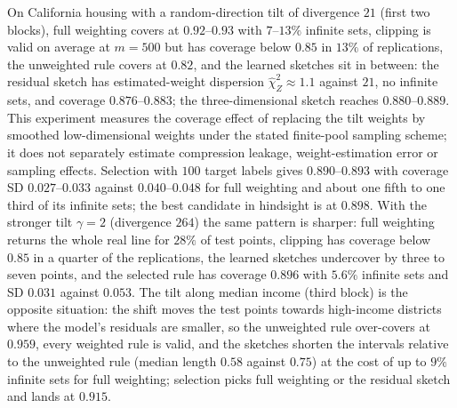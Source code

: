 \documentclass[11pt,a4paper]{article}
\theoremstyle{plain}
\theoremstyle{definition}
\theoremstyle{remark}
\begin{document}
On California housing with a random-direction tilt of divergence $21$ (first two blocks), full weighting covers at $0.92$--$0.93$ with $7$--$13\%$ infinite sets, clipping is valid on average at $m=500$ but has coverage below $0.85$ in $13\%$ of replications, the unweighted rule covers at $0.82$, and the learned sketches sit in between: the residual sketch has estimated-weight dispersion $\hat\chi^2_Z\approx1.1$ against $21$, no infinite sets, and coverage $0.876$--$0.883$; the three-dimensional sketch reaches $0.880$--$0.889$. This experiment measures the coverage effect of replacing the tilt weights by smoothed low-dimensional weights under the stated finite-pool sampling scheme; it does not separately estimate compression leakage, weight-estimation error or sampling effects. Selection with $100$ target labels gives $0.890$--$0.893$ with coverage SD $0.027$--$0.033$ against $0.040$--$0.048$ for full weighting and about one fifth to one third of its infinite sets; the best candidate in hindsight is at $0.898$. With the stronger tilt $\gamma=2$ (divergence $264$) the same pattern is sharper: full weighting returns the whole real line for $28\%$ of test points, clipping has coverage below $0.85$ in a quarter of the replications, the learned sketches undercover by three to seven points, and the selected rule has coverage $0.896$ with $5.6\%$ infinite sets and SD $0.031$ against $0.053$. The tilt along median income (third block) is the opposite situation: the shift moves the test points towards high-income districts where the model's residuals are smaller, so the unweighted rule over-covers at $0.959$, every weighted rule is valid, and the sketches shorten the intervals relative to the unweighted rule (median length $0.58$ against $0.75$) at the cost of up to $9\%$ infinite sets for full weighting; selection picks full weighting or the residual sketch and lands at $0.915$.
\end{document}
